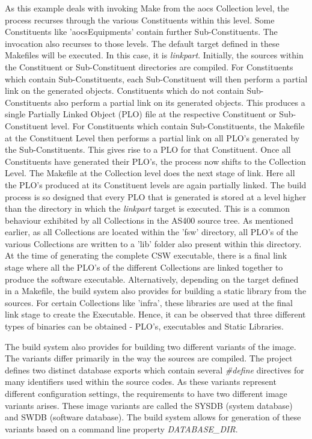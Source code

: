 \documentclass[12pt, a4paper, titlepage]{scrartcl}
\newcommand{\courierword}[1]{\textsf{\itshape #1}}{\fontfamily{pcr}\selectfont}%
\begin{document}
\par As this example deals with invoking Make from the aocs Collection level, the process recurses through the various Constituents within this level. Some Constituents like 'aocsEquipments' contain further Sub-Constituents. The invocation also recurses to those levels. The default target defined in these Makefiles will be executed. In this case, it is \courierword{linkpart}. Initially, the sources within the Constituent or Sub-Constituent directories are compiled. For Constituents which contain Sub-Constituents, each Sub-Constituent will then perform a partial link on the generated objects. Constituents which do not contain Sub-Constituents also perform a partial link on its generated objects. This produces a single Partially Linked Object (PLO) file at the respective Constituent or Sub-Constituent level. For Constituents which contain Sub-Constituents, the Makefile at the Constituent Level then performs a partial link on all PLO's generated by the Sub-Constituents. This gives rise to a PLO for that Constituent. Once all Constituents have generated their PLO's, the process now shifts to the Collection Level. The Makefile at the Collection level does the next stage of link. Here all the PLO's produced at its Constituent levels are again partially linked. The build process is so designed that every PLO that is generated is stored at a level higher than the directory in which the \courierword{linkpart} target is executed. This is a common behaviour exhibited by all Collections in the AS400 source tree. As mentioned earlier, as all Collections are located within the 'fsw' directory, all PLO's of the various Collections are written to a 'lib' folder also present within this directory. At the time of generating the complete CSW executable, there is a final link stage where all the PLO's of the different Collections are linked together to produce the software executable. Alternatively, depending on the target defined in a Makefile, the build system also provides for building a static library from the sources. For certain Collections like 'infra', these libraries are used at the final link stage to create the Executable. Hence, it can be observed that three different types of binaries can be obtained - PLO's, executables and Static Libraries. 
\par The build system also provides for building two different variants of the image. The variants differ primarily in the way the sources are compiled. The project defines two distinct database exports which contain several \textit{\#define} directives\cite{stallman1987c} for many identifiers used within the source codes. As these variants represent different configuration settings, the requirements to have two different image variants arises. These image variants are called the SYSDB (system database) and SWDB (software database). The build system allows for generation of these variants based on a command line property \courierword{DATABASE\_DIR}.
\end{document}
